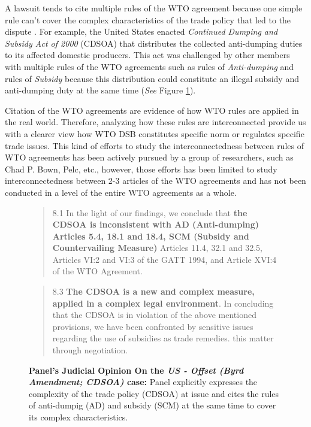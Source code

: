 A lawsuit tends to cite multiple rules of the WTO agreement because one simple rule can't cover the complex characteristics of the trade policy that led to the dispute \citep{palmeter2004dispute}.
For example, the United States enacted \textit{Continued Dumping and Subsidy Act of 2000} (CDSOA) that distributes
the collected anti-dumping duties to its affected domestic producers.
This act was challenged by other members with multiple rules of
the WTO agreements such as rules of \textit{Anti-dumping} and rules of \textit{Subsidy} because
this distribution could constitute an illegal subsidy and anti-dumping duty at the same time (\textit{See} Figure \ref{fig:complex-measure}).

Citation of the WTO agreements are evidence of how WTO rules are applied in the real world. Therefore, analyzing how these rules are interconnected provide us with a clearer view how WTO DSB constitutes specific norm or regulates specific trade issues. 
This kind of efforts to study the interconnectedness between rules of WTO agreements has been actively pursued by a group of researchers, such as Chad P. Bown, Pelc, etc., however, those efforts has been limited to 
study interconnectedness between 2-3 articles of the WTO agreements and has not been conducted in a level of the entire WTO agreements as a whole.






\begin{figure}[h]
    \begin{quote}
        8.1 In the light of our findings, we conclude that \textbf{the CDSOA is inconsistent with AD (Anti-dumping)
        Articles 5.4, 18.1 and 18.4, SCM (Subsidy and Countervailing Measure)} Articles 11.4, 32.1 and 32.5, Articles VI:2 and VI:3 of the GATT
        1994, and Article XVI:4 of the WTO Agreement.
    \end{quote} 
    \begin{quote}
        \centering{\ldots}
    \end{quote}
    \begin{quote}
        8.3 \textbf{The CDSOA is a new and complex measure, applied in a complex legal environment}. In
        concluding that the CDSOA is in violation of the above mentioned provisions, we have been
        confronted by sensitive issues regarding the use of subsidies as trade remedies.
        this matter through negotiation.
    \end{quote} 
    \caption{\textbf{Panel's Judicial Opinion On the \textit{US - Offset (Byrd Amendment; CDSOA)} case:} Panel explicitly expresses the complexity of the trade policy (CDSOA) at issue and cites the rules of anti-dumpig (AD) and subsidy (SCM) at the same time to cover its complex characteristics.}
    \label{fig:complex-measure}
\end{figure}

